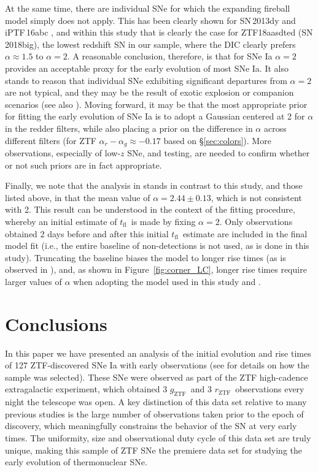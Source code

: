 \documentclass[twocolumn]{./aastex63}
\newcommand{\rztf}{$r_\mathrm{ZTF}$}
\newcommand{\gztf}{$g_\mathrm{ZTF}$}
\newcommand{\tfl}{$t_\mathrm{fl}$}
\begin{document}
At the same time, there are individual SNe for which the expanding fireball
model simply does not apply. This has been clearly shown for SN\,2013dy and
iPTF\,16abc \citep{Zheng13,Miller18}, and within this study that is clearly the
case for ZTF18aasdted (SN\,2018big), the lowest redshift SN in our sample, where
the DIC clearly prefers $\alpha \approx 1.5$ to $\alpha = 2$. A reasonable
conclusion, therefore, is that for SNe Ia $\alpha = 2$ provides an acceptable
proxy for the early evolution of most SNe Ia. It also stands to reason that
individual SNe exhibiting significant departures from $\alpha = 2$ are not
typical, and they may be the result of exotic explosion or companion scenarios
(see also \citealt{Miller18}). Moving forward, it may be that the most
appropriate prior for fitting the early evolution of SNe Ia is to adopt a
Gaussian centered at 2 for $\alpha$ in the redder filters, while also placing a
prior on the difference in $\alpha$ across different filters (for ZTF $\alpha_r
- \alpha_g \approx -0.17$ based on \S\ref{sec:colors}). More observations,
especially of low-$z$ SNe, and testing, are needed to confirm whether or not
such priors are in fact appropriate.

Finally, we note that the analysis in \citet{Firth15} stands in contrast to this
study, and those listed above, in that the mean value of $\alpha = 2.44 \pm
0.13$, which is not consistent with 2. This result can be understood in the
context of the \citet{Firth15} fitting procedure, whereby an initial estimate of
\tfl\ is made by fixing $\alpha = 2$. Only observations obtained 2 days before
and after this initial \tfl\ estimate are included in the final model fit (i.e.,
the entire baseline of non-detections is not used, as is done in this study).
Truncating the baseline biases the model to longer rise times (as is observed in
\citealt{Firth15}), and, as shown in Figure~\ref{fig:corner_LC}, longer rise
times require larger values of $\alpha$ when adopting the model used in this
study and \citet{Firth15}.

\section{Conclusions}

In this paper we have presented an analysis of the initial evolution and rise
times of 127 ZTF-discovered SNe Ia with early observations (see \citealt{Yao19}
for details on how the sample was selected). These SNe were observed as part of
the ZTF high-cadence extragalactic experiment, which obtained 3 \gztf\ and 3
\rztf\ observations every night the telescope was open. A key distinction of
this data set relative to many previous studies is the large number of
observations taken prior to the epoch of discovery, which meaningfully
constrains the behavior of the SN at very early times. The uniformity, size and
observational duty cycle of this data set are truly unique, making this sample
of ZTF SNe the premiere data set for studying the early evolution of
thermonuclear SNe.
\end{document}
